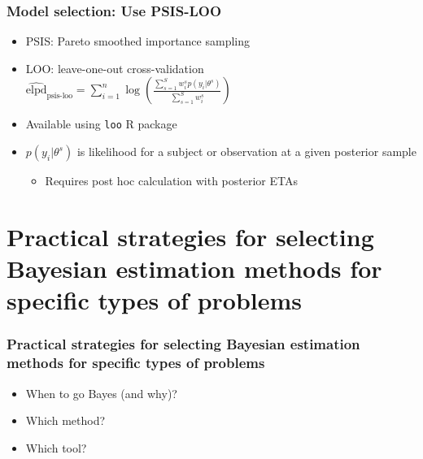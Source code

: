 \documentclass[handout]{beamer}
\begin{document}
\begin{frame}[fragile]
  \frametitle{Model selection: Use PSIS-LOO}

\begin{itemize}
  \item \textcolor{mrggreen}{PSIS}: Pareto smoothed importance sampling
  \item \textcolor{mrggreen}{LOO}: leave-one-out cross-validation\\
  \quad $\widehat{\text{elpd}}_{\text{psis-loo}} = \sum_{i=1}^n \log\left(\frac{\sum_{s=1}^S w_i^s p(y_i|\theta^s)}{\sum_{s=1}^S w_i^s}\right)$
  \vspace{1em}
  \item Available using \verb|loo| R package
  \item \textcolor{mrggreen}{$p(y_i|\theta^s)$} is likelihood for a subject or observation at a given posterior sample
        \begin{itemize}
          \item Requires post hoc calculation with posterior ETAs
        \end{itemize}
\end{itemize}

\end{frame}

\section[Selecting Bayesian estimation methods]{Practical strategies for selecting Bayesian estimation methods for specific types of problems}

\begin{frame}
  \frametitle{Practical strategies for selecting Bayesian estimation
    methods for specific types of problems}
  
  \begin{itemize}
  \item When to go Bayes (and why)?
  \item Which method?
  \item Which tool?
  \end{itemize}

\end{frame}
\end{document}
